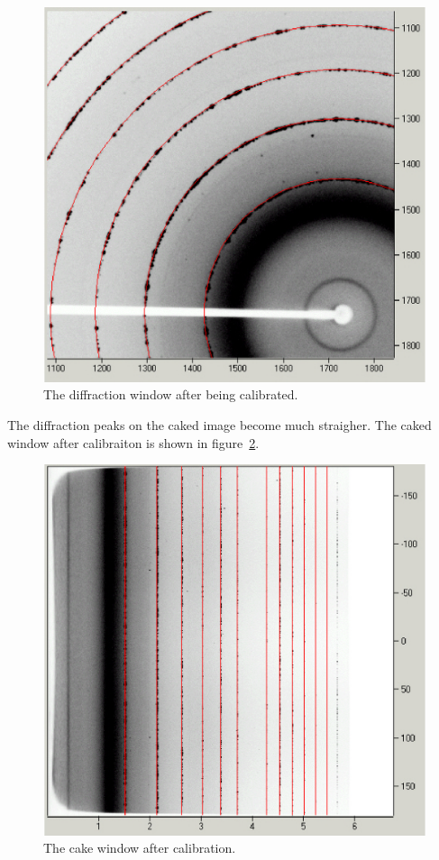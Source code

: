 \begin{figure}[h]
    \centering
    \includegraphics[scale=.75]{figures/good_calibration_diffraction_image.eps}
    \caption{The diffraction window after being calibrated.}
    \label{good_calibration_diffraction_image}
\end{figure}

The diffraction peaks on the caked image become much straigher.
The caked window after calibraiton is shown in 
figure~\ref{good_calibration_cake}.

\begin{figure}[h]
    \centering
    \includegraphics[scale=.75]{figures/good_calibration_cake.eps}
    \caption{The cake window after calibration.}
    \label{good_calibration_cake}
\end{figure}

